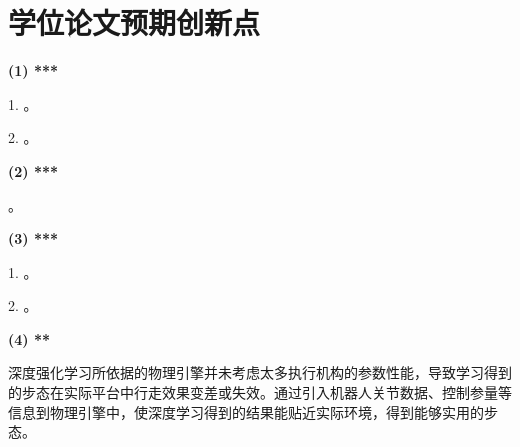 
\section{学位论文预期创新点}

\noindent \textbf{(1) ***}

1. 。

2. 。

\noindent \textbf{(2) ***}

。

\noindent \textbf{(3) ***}

1. 。


2. 。

\noindent \textbf{(4) **}

深度强化学习所依据的物理引擎并未考虑太多执行机构的参数性能，导致学习得到的步态在实际平台中行走效果变差或失效。通过引入机器人关节数据、控制参量等信息到物理引擎中，使深度学习得到的结果能贴近实际环境，得到能够实用的步态。


